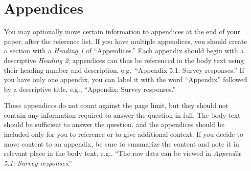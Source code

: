 \documentclass{jdf}
\begin{document}
\hypertarget{appendices}{%
\section{Appendices}\label{appendices}}

You may optionally move certain information to appendices at the end of
your paper, after the reference list. If you have multiple appendices,
you should create a section with a \emph{Heading 1} of ``Appendices.''
Each appendix should begin with a descriptive \emph{Heading 2};
appendices can thus be referenced in the body text using their heading
number and description, e.g.~``Appendix 5.1: Survey responses.'' If you
have only one appendix, you can label it with the word ``Appendix''
followed by a descriptive title, e.g., ``Appendix: Survey responses.''

These appendices do not count against the page limit, but they should
not contain any information required to answer the question in full. The
body text should be sufficient to answer the question, and the
appendices should be included only for you to reference or to give
additional context. If you decide to move content to an appendix, be
sure to summarize the content and note it in relevant place in the body
text, e.g., ``The raw data can be viewed in \emph{Appendix 5.1: Survey
responses}.''


\printbibliography
\end{document}
